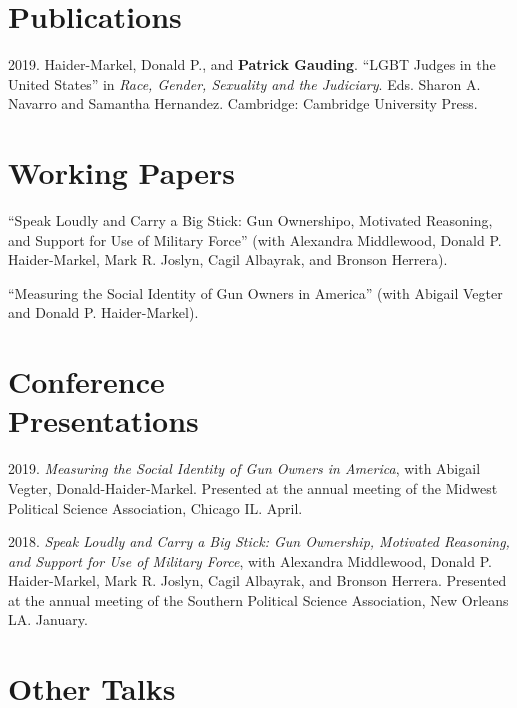 \documentclass[margin,line,pifont,palatino,courier]{res}
\newenvironment{list1}{
  \begin{list}{\ding{113}}{%
      \setlength{\itemsep}{0in}
      \setlength{\parsep}{0in} \setlength{\parskip}{0in}
      \setlength{\topsep}{0in} \setlength{\partopsep}{0in}
      \setlength{\leftmargin}{0.17in}}}{\end{list}}
\newenvironment{list2}{
  \begin{list}{$\bullet$}{%
      \setlength{\itemsep}{0in}
      \setlength{\parsep}{0in} \setlength{\parskip}{0in}
      \setlength{\topsep}{0in} \setlength{\partopsep}{0in}
      \setlength{\leftmargin}{0.2in}}}{\end{list}}
\begin{document}
\begin{resume}
\begin{list1}

\end{list1}


\section{\sc Publications}

2019. Haider-Markel, Donald P., and \textbf{Patrick Gauding}. ``LGBT Judges
in the United States'' in \textit{Race, Gender, Sexuality and the
  Judiciary}. Eds. Sharon A. Navarro  and Samantha
Hernandez. Cambridge: Cambridge University Press.

\section{\sc Working Papers}

``Speak Loudly and Carry a Big Stick: Gun Ownershipo, Motivated
Reasoning, and Support for Use of Military Force'' (with Alexandra
Middlewood, Donald P. Haider-Markel, Mark R. Joslyn, Cagil Albayrak,
and Bronson Herrera).

``Measuring the Social Identity of Gun Owners in America'' (with
Abigail Vegter and Donald P. Haider-Markel).

\section{\sc Conference \\ Presentations}

2019. \emph{Measuring the Social Identity of Gun Owners in America},
with Abigail Vegter, Donald-Haider-Markel. Presented at the annual
meeting of the Midwest Political Science Association, Chicago IL. April.

2018. \emph{Speak Loudly and Carry a Big Stick: Gun Ownership, Motivated
  Reasoning, and Support for Use of Military Force}, with Alexandra
Middlewood, Donald P. Haider-Markel, Mark R. Joslyn, Cagil Albayrak,
and Bronson Herrera. Presented at the annual meeting of the Southern
Political Science Association, New Orleans LA. January.

\section{\sc Other Talks}


\end{resume}
\end{document}
